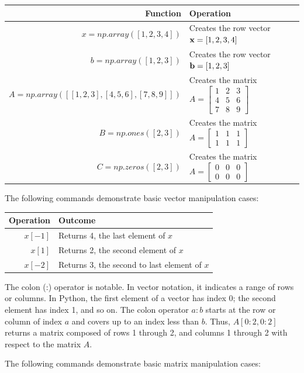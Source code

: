 \begin{tabular}{r|l}
Function 			& Operation \\
\hline
$x = np.array([1,2,3,4])$ 					&   Creates the row vector $\textbf{x} = [1,2,3,4]$\\
$b = np.array([1,2,3])$ 					&   Creates the row vector $\textbf{b} = [1,2,3]$\\
$A = np.array([[1,2,3], [4,5,6], [7,8,9]])$  &   Creates the matrix $ A = \begin{bmatrix} 1 & 2 & 3\\ 4 & 5 & 6 \\ 7 & 8 & 9 \end{bmatrix} $\\
$B = np.ones([2,3])$   &   Creates the matrix $ A = \begin{bmatrix} 1 & 1 & 1\\ 1 & 1 & 1 \end{bmatrix} $\\
$C = np.zeros([2,3])$   &   Creates the matrix $ A = \begin{bmatrix} 0 & 0 & 0\\ 0 & 0 & 0 \end{bmatrix} $\\
\hline
\end{tabular}

\vs
The following commands demonstrate basic vector manipulation cases:
\vs

\begin{tabular}{r|l}
Operation 			& Outcome \\
\hline
$x[-1]$ 				&   Returns 4, the last element of $x$\\
$x[1]$ 					&   Returns 2, the second element of $x$\\
$x[-2]$ 				&  Returns 3, the second to last element of $x$\\
\hline
\end{tabular}

\vs
The colon (:) operator is notable. In vector notation, it indicates a range of rows or columns. In Python, the first element of a vector has index 0; the second element has index 1, and so on. The colon operator $a:b$ starts at the row or column  of index $a$ and covers up to an index less than $b$. Thus,  $A[0:2,0:2]$ returns a matrix composed of rows 1 through 2, and columns 1 through 2 with respect to the matrix $A$. 

The following commands demonstrate basic matrix manipulation cases:
\vs

